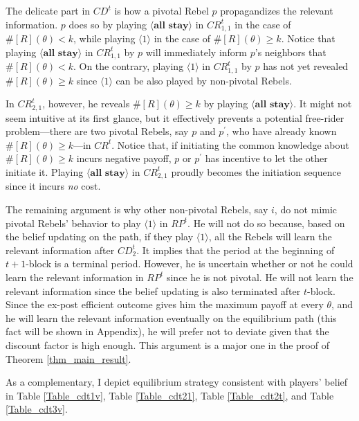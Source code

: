 \documentclass[12pt,letter]{article}
\theoremstyle{definition}
\theoremstyle{remark}
\theoremstyle{claim}
\begin{document}
\clearpage

The delicate part in $CD^t$ is how a pivotal Rebel $p$ propagandizes the relevant information. $p$ does so by playing $\langle \textbf{all stay} \rangle$ in $CR^{t}_{1,1}$ in the case of $\#[R](\theta)< k$, while playing $\langle 1 \rangle$ in the case of $\#[R](\theta)\geq k$. Notice that playing $\langle \textbf{all stay} \rangle$ in $CR^{t}_{1,1}$ by $p$ will immediately inform $p$'s neighbors that $\#[R](\theta)< k$. On the contrary, playing $\langle 1 \rangle$ in $CR^{t}_{1,1}$ by $p$ has not yet revealed $\#[R](\theta)\geq k$ since $\langle 1 \rangle$ can be also played by non-pivotal Rebels. 

In $CR^{t}_{2,1}$, however, he reveals $\#[R](\theta)\geq k$ by playing $\langle \textbf{all stay} \rangle$. It might not seem intuitive at its first glance, but it effectively prevents a potential free-rider problem---there are two pivotal Rebels, say $p$ and $p^{'}$, who have already known $\#[R](\theta)\geq k$---in $CR^t$. Notice that, if initiating the common knowledge about $\#[R](\theta)\geq k$ incurs negative payoff, $p$ or $p^{'}$ has incentive to let the other initiate it. Playing $\langle \textbf{all stay} \rangle$ in $CR^t_{2,1}$ proudly becomes the initiation sequence since it incurs \textit{no} cost.

The remaining argument is why other non-pivotal Rebels, say $i$, do not mimic pivotal Rebels' behavior to play $\langle 1 \rangle$ in $RP^t$. He will not do so because, based on the belief updating on the path, if they play $\langle 1 \rangle$, all the Rebels will learn the relevant information after $CD^t_2$. It implies that the period at the beginning of $t+1$-block is a terminal period. However, he is uncertain whether or not he could learn the relevant information in $RP^t$ since he is not pivotal. He will not learn the relevant information since the belief updating is also terminated after $t$-block. Since the ex-post efficient outcome gives him the maximum payoff at every $\theta$, and he will learn the relevant information eventually on the equilibrium path (this fact will be shown in Appendix), he will prefer not to deviate given that the discount factor is high enough. This argument is a major one in the proof of Theorem \ref{thm_main_result}.

As a complementary, I depict equilibrium strategy consistent with players' belief in Table \ref{Table_cdt1v}, Table \ref{Table_cdt21}, Table \ref{Table_cdt2t}, and Table \ref{Table_cdt3v}.
\end{document}
